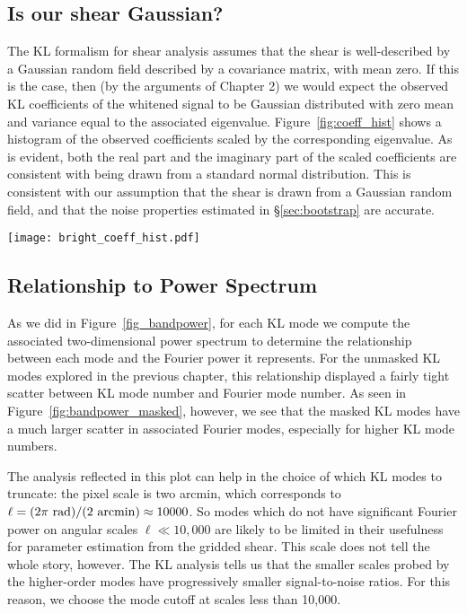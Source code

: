 \subsection{Is our shear Gaussian?}

The KL formalism for shear analysis assumes that the shear is well-described
by a Gaussian random field described by a covariance matrix, with mean
zero.  If this is the case, then (by the arguments of Chapter 2) we would
expect the observed KL coefficients of the whitened signal to be Gaussian
distributed with zero mean and variance equal to the associated eigenvalue.
Figure~\ref{fig:coeff_hist} shows a histogram of the observed coefficients
scaled by the corresponding eigenvalue.  As is evident, both the real
part and the imaginary part of the scaled coefficients are consistent with
being drawn from a standard normal distribution.  This is consistent with
our assumption that the shear is drawn from a Gaussian random field, and
that the noise properties estimated in \S\ref{sec:bootstrap} are accurate.

\begin{figure*}
 \centering
 \texttt{[image: bright\_coeff\_hist.pdf]}
 \caption{
   The histogram of normalized coefficients $a_i / \sqrt{\lambda_i}$.
   If the shear is truly a gaussian random field, this distribution should
   be a gaussian with unit variance.
   \label{fig:coeff_hist}}
\end{figure*}

\subsection{Relationship to Power Spectrum}
As we did in Figure~\ref{fig_bandpower}, for each KL mode we compute the
associated two-dimensional power spectrum to determine the relationship
between each mode and the Fourier power it represents.  For the unmasked
KL modes explored in the previous chapter, this relationship displayed a
fairly tight scatter between KL mode number and Fourier mode number.
As seen in Figure~\ref{fig:bandpower_masked}, however, we see that the
masked KL modes have a much larger scatter in associated Fourier modes,
especially for higher KL mode numbers.

The analysis reflected in this plot can help in the choice of which KL
modes to truncate: the pixel scale is two arcmin, which corresponds to
$\ell = (2\pi\ {\rm rad}) / (2\ {\rm arcmin}) \approx 10000$.  So modes
which do not have significant Fourier power on angular scales
$\ell \ll 10,000$ are likely to be limited in their usefulness for parameter
estimation from the gridded shear.  This scale does not tell the whole story,
however.  The KL analysis tells us that the smaller scales probed by the
higher-order modes have progressively smaller signal-to-noise ratios.  For
this reason, we choose the mode cutoff at scales less than 10,000.

